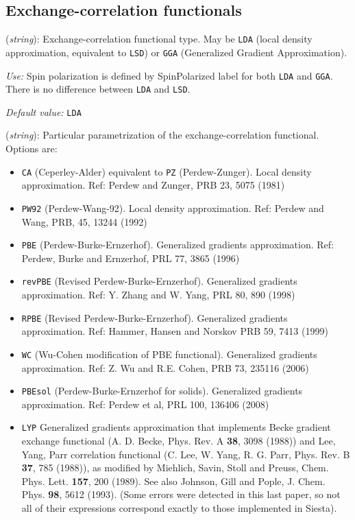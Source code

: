 \documentclass[11pt]{article}
\begin{document}
\vspace{5pt}
\subsection{Exchange-correlation functionals}

\begin{description}
\itemsep 10pt
\parsep 0pt

\item[{\bf XC.functional}] ({\it string}): 
Exchange-correlation functional type. May be {\tt LDA} 
(local density approximation, equivalent to {\tt LSD}) or 
{\tt GGA} (Generalized Gradient Approximation). 

{\it Use:} Spin polarization is defined by SpinPolarized label for
both {\tt LDA} and {\tt GGA}. There is no difference between {\tt LDA}
and {\tt LSD}.

{\it Default value:} {\tt LDA}
        

\item[{\bf XC.authors}] ({\it string}): 
Particular parametrization of the
exchange-correlation functional. Options are:
\begin{itemize}
\item {\tt CA} (Ceperley-Alder) 
equivalent to {\tt PZ} (Perdew-Zunger). 
Local density approximation.
Ref: Perdew and Zunger, PRB 23, 5075 (1981)
\item {\tt PW92} (Perdew-Wang-92). 
Local density approximation.
Ref: Perdew and Wang, PRB, 45, 13244 (1992)
\item {\tt PBE} (Perdew-Burke-Ernzerhof). Generalized gradients
approximation.  Ref: Perdew, Burke and Ernzerhof, PRL 77, 3865
(1996) 
\item {\tt revPBE} (Revised Perdew-Burke-Ernzerhof). Generalized gradients
approximation.  Ref: Y. Zhang and W. Yang, PRL 80, 890 
(1998) 
\item {\tt RPBE} (Revised Perdew-Burke-Ernzerhof). Generalized gradients
approximation.  Ref: Hammer, Hansen and Norskov PRB 59, 7413 
(1999) 
\item {\tt WC} (Wu-Cohen modification of PBE functional). Generalized gradients
approximation.  Ref: Z. Wu and R.E. Cohen, PRB 73, 235116 (2006)
 
\item {\tt PBEsol} (Perdew-Burke-Ernzerhof for solids). Generalized gradients
approximation.  Ref: Perdew et al, PRL 100, 136406
(2008) 
\item {\tt LYP} Generalized gradients approximation 
that implements Becke gradient exchange functional (A. D.
Becke, Phys. Rev. A {\bf 38}, 3098 (1988)) and Lee, Yang, Parr
correlation functional (C. Lee, W. Yang, R. G. Parr, Phys. Rev. B
{\bf 37}, 785 (1988)), as modified by Miehlich, Savin, Stoll and Preuss,
Chem. Phys. Lett. {\bf 157}, 200 (1989). See also Johnson, Gill and Pople,
J. Chem. Phys. {\bf 98}, 5612 (1993). (Some errors were detected in this
last paper, so not all of their expressions correspond exactly to those
implemented in {\sc Siesta}).


\end{itemize}
\end{description}
\end{document}
